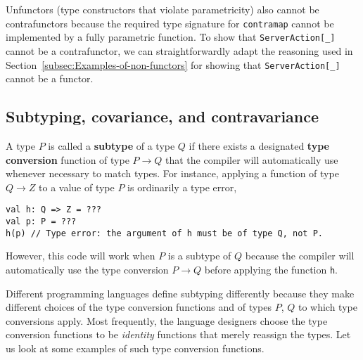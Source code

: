 Unfunctors (type constructors that violate parametricity)
also cannot be contrafunctors because the required type signature
for \lstinline!contramap! cannot be implemented by a fully parametric
function. To show that \lstinline!ServerAction[_]! cannot be a contrafunctor,
we can straightforwardly adapt the reasoning used in Section~\ref{subsec:Examples-of-non-functors}
for showing that \lstinline!ServerAction[_]! cannot be a functor.

\subsection{Subtyping, covariance, and contravariance}

A type $P$ is called a \textbf{subtype}
of a type $Q$ if there exists a designated
\textbf{type conversion} function of type $P\rightarrow Q$ that the
compiler will automatically use whenever necessary to match types.
For instance, applying a function of type $Q\rightarrow Z$ to a value
of type $P$ is ordinarily a type error,
\begin{lstlisting}
val h: Q => Z = ???
val p: P = ???
h(p) // Type error: the argument of h must be of type Q, not P.
\end{lstlisting}
However, this code will work when $P$ is a subtype of $Q$ because
the compiler will automatically use the type conversion $P\rightarrow Q$
before applying the function \lstinline!h!.

Different programming languages define subtyping differently because
they make different choices of the type conversion functions and of
types $P$, $Q$ to which type conversions apply. Most frequently,
the language designers choose the type conversion functions to be
\emph{identity} functions that merely reassign the types. Let us look
at some examples of such type conversion functions. 

